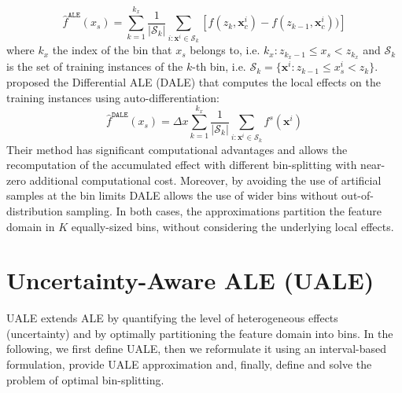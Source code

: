 \documentclass[twoside]{article}
\newcommand{\xc}{\mathbf{x}_c}
\newcommand{\xb}{\mathbf{x}}
\begin{document}
\begin{equation}
  \label{eq:ALE_accumulated_mean_est}
  \hat{f}^{\mathtt{ALE}}(x_s) = \sum_{k=1}^{k_x} \frac{1}{|\mathcal{S}_k|} \sum_{i:\mathbf{x}^i \in
    \mathcal{S}_k} \left [ f(z_{k}, \xc^i) - f(z_{k-1}, \xc^i)) \right ]
\end{equation}
%
where \(k_x\) the index of the bin that \(x_s\) belongs to,
i.e. \(k_x: z_{k_x-1} \leq x_s < z_{k_x} \) and \(\mathcal{S}_k\) is
the set of training instances of the \(k\)-th bin, i.e.
\( \mathcal{S}_k = \{ \xb^i : z_{k-1} \leq x^i_s < z_{k} \}
\). \citep{gkolemis22} proposed the Differential ALE (DALE) that
computes the local effects on the training instances using
auto-differentiation:
\begin{equation}  \label{eq:DALE_accumulated_mean_est}
  \hat{f}^{\mathtt{DALE}}(x_s) = \Delta x \sum_{k=1}^{k_x} \frac{1}{|\mathcal{S}_k|} \sum_{i:\mathbf{x}^i \in
    \mathcal{S}_k} f^s(\mathbf{x}^i)
\end{equation}
%
Their method has significant computational advantages and allows the
recomputation of the accumulated effect with different bin-splitting
with near-zero additional computational cost. Moreover, by avoiding
the use of artificial samples at the bin limits DALE allows the use of
wider bins without out-of-distribution sampling. In both cases, the
approximations partition the feature domain in \(K\) equally-sized
bins, without considering the underlying local effects.


\section{Uncertainty-Aware ALE (UALE)}
\label{sec:UALE}

UALE extends ALE by quantifying the level of heterogeneous effects
(uncertainty) and by optimally partitioning the feature domain into
bins. In the following, we first define UALE, then we reformulate it
using an interval-based formulation, provide UALE approximation and,
finally, define and solve the problem of optimal bin-splitting.
\end{document}
